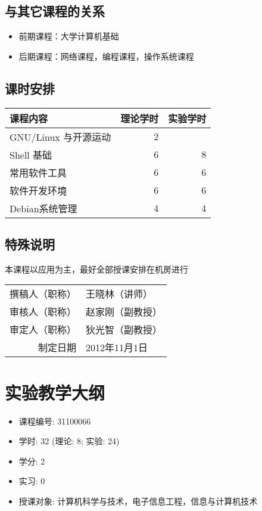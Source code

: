 \documentclass{wx672article}
\makeatletter
\newcommand{\Sign}{\begin{flushright}%
  \begin{tabular}{r@{：\,}l}%
    撰稿人（职称）&王晓林（讲师）\\%
    审核人（职称）&赵家刚（副教授）\\%
    审定人（职称）&狄光智（副教授）\\%
    制定日期&2012年11月1日%
  \end{tabular}%
\end{flushright}}
\makeatother
\begin{document}
\subsection{与其它课程的关系}

\begin{itemize}
\item 前期课程：大学计算机基础
\item 后期课程：网络课程，编程课程，操作系统课程
\end{itemize}

\subsection{课时安排}

\begin{center}
  \begin{tabular}{lrr}
    \hline
    课程内容              &  理论学时  &  实验学时  \\
    \hline
    GNU/Linux 与开源运动  &         2  &            \\
    Shell 基础            &        6  &         8  \\
    常用软件工具          &         6  &         6  \\
    软件开发环境          &         6  &         6  \\
    Debian系统管理        &         4  &         4  \\
    \hline
  \end{tabular}
\end{center}

\subsection{特殊说明}
本课程以应用为主，最好全部授课安排在机房进行

\Sign{}

\section{实验教学大纲}
\label{sec:lab}

\begin{itemize}
\item 课程编号: 31100066
\item 学时: 32 (理论: 8; 实验: 24)
\item 学分: 2
\item 实习: 0
\item 授课对象: 计算机科学与技术，电子信息工程，信息与计算机技术
\end{itemize}
\end{document}

